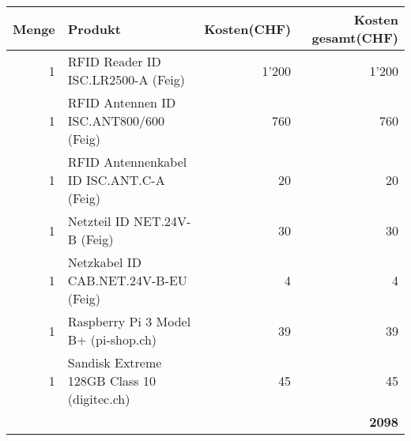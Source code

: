\vspace{1em}

\begin{tabularx}{\textwidth}{|r|X|r|r|}
	\hline 
	\textbf{Menge} & \textbf{Produkt} & \textbf{Kosten(CHF)} & \textbf{Kosten gesamt(CHF)} \\
	\hline 
	1 & RFID Reader ID ISC.LR2500-A (Feig) & 1'200 & 1'200 \\ 
	\hline 
	1 & RFID Antennen ID ISC.ANT800/600 (Feig)& 760 & 760 \\
	\hline
	1 & RFID Antennenkabel ID ISC.ANT.C-A (Feig) & 20 & 20 \\
	\hline
	1 & Netzteil ID NET.24V-B (Feig) & 30 & 30 \\
	\hline
	1 & Netzkabel ID CAB.NET.24V-B-EU (Feig) & 4 & 4 \\
	\hline
	1 & Raspberry Pi 3 Model B+ (pi-shop.ch)& 39 & 39 \\
	\hline
	1 & Sandisk Extreme 128GB Class 10 (digitec.ch)& 45 & 45 \\
	\hline
	& & & \textbf{2098} \\
	\hline
\end{tabularx} 
